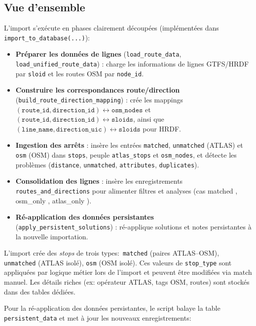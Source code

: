 \subsection*{Vue d'ensemble}
L'import s'exécute en phases clairement découpées (implémentées dans \texttt{import\_to\_database(...)}):
\begin{itemize}
  \item \textbf{Préparer les données de lignes} (\texttt{load\_route\_data}, \texttt{load\_unified\_route\_data}) : charge les informations de lignes GTFS/HRDF par \texttt{sloid} et les routes OSM par \texttt{node\_id}.
  \item \textbf{Construire les correspondances route/direction} (\texttt{build\_route\_direction\_mapping}) : crée les mappings \((\texttt{route\_id}, \texttt{direction\_id}) \leftrightarrow \texttt{osm\_nodes}\) et \((\texttt{route\_id}, \texttt{direction\_id}) \leftrightarrow \texttt{sloids}\), ainsi que \((\texttt{line\_name}, \texttt{direction\_uic}) \leftrightarrow \texttt{sloids}\) pour HRDF.
  \item \textbf{Ingestion des arrêts} : insère les entrées \texttt{matched}, \texttt{unmatched} (ATLAS) et \texttt{osm} (OSM) dans \texttt{stops}, peuple \texttt{atlas\_stops} et \texttt{osm\_nodes}, et détecte les problèmes (\texttt{distance}, \texttt{unmatched}, \texttt{attributes}, \texttt{duplicates}).
  \item \textbf{Consolidation des lignes} : insère les enregistrements \texttt{routes\_and\_directions} pour alimenter filtres et analyses (cas \og matched \fg{}, \og osm\_only \fg{}, \og atlas\_only \fg{}).
  \item \textbf{Ré-application des données persistantes} (\texttt{apply\_persistent\_solutions}) : ré-applique solutions et notes persistantes à la nouvelle importation.
\end{itemize}

L'import crée des \textit{stops} de trois types:\ \texttt{matched} (paires ATLAS–OSM), \texttt{unmatched} (ATLAS isolé), \texttt{osm} (OSM isolé). Ces valeurs de \texttt{stop\_type} sont appliquées par logique métier lors de l'import et peuvent être modifiées via match manuel. Les détails riches (ex: opérateur ATLAS, tags OSM, routes) sont stockés dans des tables dédiées.

Pour la ré-application des données persistantes, le script balaye la table \texttt{persistent\_data} et met à jour les nouveaux enregistrements:

